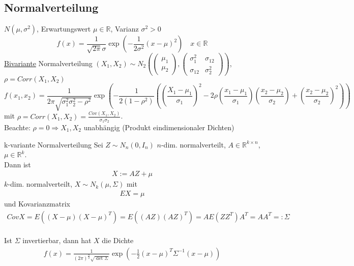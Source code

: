\documentclass[a4paper,openany]{book}
\theoremstyle{mytheoremstyle}
\theoremstyle{mytheoremstyle2}
\begin{document}
\subsection{Normalverteilung} $N(\mu ,\sigma ^2)$, Erwartungswert $\mu \in \mathbb{R}$, Varianz $\sigma ^2>0$ 
\[
  f(x)=\frac{1}{\sqrt{2 \pi }\sigma }\exp \left(-\frac{1}{2 \sigma ^2}(x-\mu )^2\right)\quad x \in \mathbb{R}
\]
\underline{Bivariante} Normalverteilung $(X_1,X_2)\sim N_2 \left(\begin{pmatrix}\mu _1\\\mu _2\end{pmatrix},\begin{pmatrix}
    \sigma _1^2&\sigma _{12}\\\sigma _{12}&\sigma _2^2
\end{pmatrix}\right)$, $\rho =Corr(X_1,X_2)$
\[
  f(x_1,x_2)=\frac{1}{2 \pi \sqrt{\sigma _1^2 \sigma _2^2-\rho^2}}\exp \left(-\frac{1}{2(1-\rho^2)}\left(\left(\frac{X_1-\mu _1}{\sigma _1}\right)^2-2 \rho \left(\frac{x_1-\mu _1}{\sigma _1}\right)\left(\frac{x_2-\mu _2}{\sigma _2}\right)+\left(\frac{x_2-\mu _2}{\sigma _2}\right)^2 \right)\right) 
\]
mit $\rho=Corr(X_1,X_2)=\frac{Cov(X_1,X_2)}{\sigma _1 \sigma _2}$. \\
Beachte: $\rho=0 \Rightarrow X_1,X_2$ unabhängig (Produkt eindimensionaler Dichten)
\begin{lem}{k-variante Normalverteilung}{}
  Sei $Z\sim N_n(0,I_n)$ $n$-dim. normalverteilt, $A \in \mathbb{R}^{k \times n}$, $\mu \in \mathbb{R}^k$.\\
  Dann ist 
  \begin{align*}
    X:=AZ+\mu
  \end{align*}
   $k$-dim. normalverteilt, $X\sim N_k(\mu ,\Sigma)$ mit 
   \begin{align*}
    EX=\mu 
   \end{align*} und Kovarianzmatrix 
   \begin{align*}
    CovX=E((X-\mu )(X-\mu )^T)=E((AZ)(AZ)^T)=AE(ZZ^T)A^T=AA^T=:\Sigma
   \end{align*}\\
  Ist $\Sigma$ invertierbar, dann hat $X$ die Dichte 
  \begin{align*}
    f(x)=\frac{1}{(2 \pi )^{\frac{n}{2}}\sqrt{\det\Sigma}}\exp\left(-\frac{1}{2}(x-\mu )^T\Sigma ^{-1}(x-\mu )\right)
  \end{align*}    
\end{lem}
\end{document}
